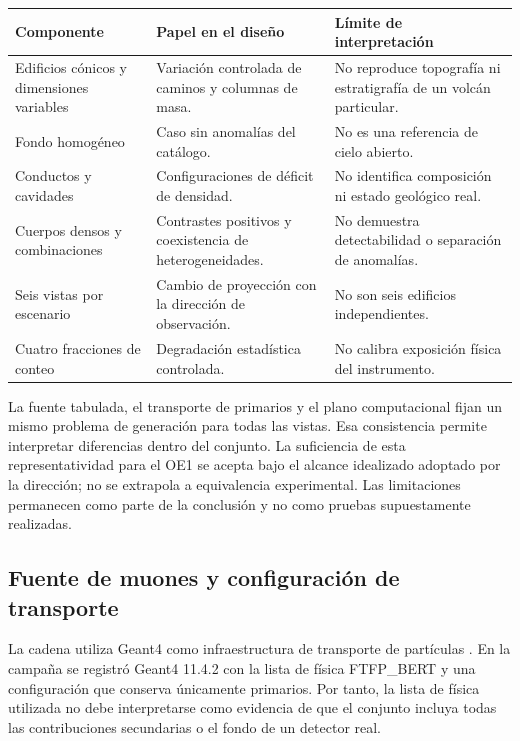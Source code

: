 \documentclass[11pt,a4paper]{article}
\begin{document}
\begin{center}
\begin{tabular}{p{}p{}p{}}
\toprule Componente & Papel en el diseño & Límite de interpretación\\\midrule
Edificios cónicos y dimensiones variables & Variación controlada de caminos y columnas de masa. & No reproduce topografía ni estratigrafía de un volcán particular.\\
Fondo homogéneo & Caso sin anomalías del catálogo. & No es una referencia de cielo abierto.\\
Conductos y cavidades & Configuraciones de déficit de densidad. & No identifica composición ni estado geológico real.\\
Cuerpos densos y combinaciones & Contrastes positivos y coexistencia de heterogeneidades. & No demuestra detectabilidad o separación de anomalías.\\
Seis vistas por escenario & Cambio de proyección con la dirección de observación. & No son seis edificios independientes.\\
Cuatro fracciones de conteo & Degradación estadística controlada. & No calibra exposición física del instrumento.\\\bottomrule
\end{tabular}
\end{center}

La fuente tabulada, el transporte de primarios y el plano computacional fijan un mismo problema de generación para todas las vistas. Esa consistencia permite interpretar diferencias dentro del conjunto. La suficiencia de esta representatividad para el OE1 se acepta bajo el alcance idealizado adoptado por la dirección; no se extrapola a equivalencia experimental. Las limitaciones permanecen como parte de la conclusión y no como pruebas supuestamente realizadas.

\subsection{Fuente de muones y configuración de transporte}

La cadena utiliza Geant4 como infraestructura de transporte de partículas \cite{agostinelli2003}. En la campaña se registró Geant4 11.4.2 con la lista de física FTFP\_BERT y una configuración que conserva únicamente primarios. Por tanto, la lista de física utilizada no debe interpretarse como evidencia de que el conjunto incluya todas las contribuciones secundarias o el fondo de un detector real.
\end{document}
